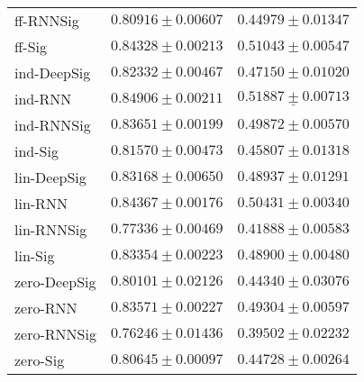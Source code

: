 \begin{tabular}{lll}
ff-RNNSig      &                           $ 0.80916 \pm 0.00607 $ &                           $ 0.44979 \pm 0.01347 $ \\
ff-Sig         &                           $ 0.84328 \pm 0.00213 $ &                           $ 0.51043 \pm 0.00547 $ \\
ind-DeepSig    &                           $ 0.82332 \pm 0.00467 $ &                           $ 0.47150 \pm 0.01020 $ \\
ind-RNN        &               $  \mathbf{ 0.84906 \pm 0.00211 } $ &            $  \underline{ 0.51887 \pm 0.00713 } $ \\
ind-RNNSig     &                           $ 0.83651 \pm 0.00199 $ &                           $ 0.49872 \pm 0.00570 $ \\
ind-Sig        &                           $ 0.81570 \pm 0.00473 $ &                           $ 0.45807 \pm 0.01318 $ \\
lin-DeepSig    &                           $ 0.83168 \pm 0.00650 $ &                           $ 0.48937 \pm 0.01291 $ \\
lin-RNN        &                           $ 0.84367 \pm 0.00176 $ &                           $ 0.50431 \pm 0.00340 $ \\
lin-RNNSig     &                           $ 0.77336 \pm 0.00469 $ &                           $ 0.41888 \pm 0.00583 $ \\
lin-Sig        &                           $ 0.83354 \pm 0.00223 $ &                           $ 0.48900 \pm 0.00480 $ \\
zero-DeepSig   &                           $ 0.80101 \pm 0.02126 $ &                           $ 0.44340 \pm 0.03076 $ \\
zero-RNN       &                           $ 0.83571 \pm 0.00227 $ &                           $ 0.49304 \pm 0.00597 $ \\
zero-RNNSig    &                           $ 0.76246 \pm 0.01436 $ &                           $ 0.39502 \pm 0.02232 $ \\
zero-Sig       &                           $ 0.80645 \pm 0.00097 $ &                           $ 0.44728 \pm 0.00264 $ \\
\bottomrule
\end{tabular}
